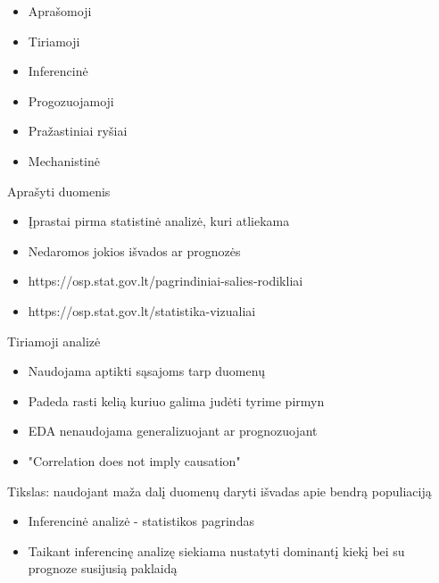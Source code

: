 \documentclass[11pt,xcolor=table]{beamer}
\begin{document}
\begin{frame}
\begin{itemize}
\item Aprašomoji 
\item Tiriamoji
\item Inferencinė
\item Progozuojamoji
\item Pražastiniai ryšiai
\item Mechanistinė
\end{itemize}
\end{frame}
\begin{frame}
Aprašyti duomenis
\begin{itemize}
\item Įprastai pirma statistinė analizė, kuri atliekama
\item Nedaromos jokios išvados ar prognozės
\item https://osp.stat.gov.lt/pagrindiniai-salies-rodikliai
\item https://osp.stat.gov.lt/statistika-vizualiai
\end{itemize}
\end{frame}
\begin{frame}
Tiriamoji analizė
\begin{itemize}
\item Naudojama aptikti sąsajoms tarp duomenų
\item Padeda rasti kelią kuriuo galima judėti tyrime pirmyn
\item EDA nenaudojama generalizuojant ar prognozuojant
\item "Correlation does not imply causation"
\end{itemize}
\end{frame}

\begin{frame}
Tikslas: naudojant maža dalį duomenų daryti išvadas apie bendrą populiaciją
\begin{itemize}
\item Inferencinė analizė - statistikos pagrindas
\item Taikant inferencinę analizę siekiama nustatyti dominantį kiekį bei su prognoze susijusią paklaidą
\end{itemize}
\end{frame}
\end{document}
